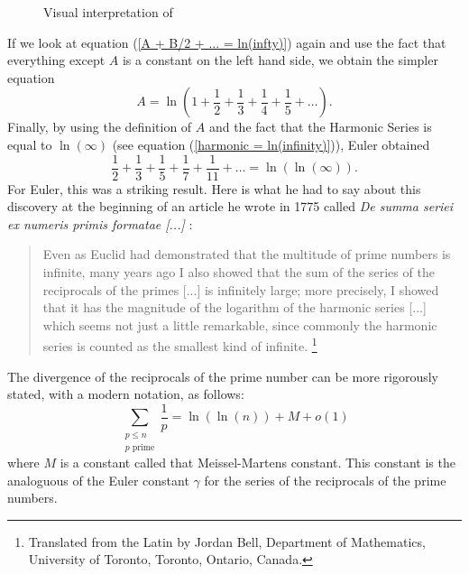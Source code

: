 \begin{figure}[h]
\begin{minipage}{.5\textwidth}
    \caption{Visual interpretation of}
    \label{fig:visual integral}
\end{minipage}
\end{figure}
If we look at equation (\ref{A + B/2 + ...  = ln(infty)}) again and use the fact that everything except $A$ is a constant on the left hand side, we obtain the simpler equation
\begin{equation}
    A = \ln\left(1 + \frac{1}{2} + \frac{1}{3} + \frac{1}{4} + \frac{1}{5} + \dots \right).
\end{equation}
Finally, by using the definition of $A$ and the fact that the Harmonic Series is equal to $\ln(\infty)$ (see equation (\ref{harmonic = ln(infinity)})), Euler obtained
\begin{equation} \label{prime harmonic = ln(ln(infty))}
    \frac{1}{2} + \frac{1}{3} + \frac{1}{5} + \frac{1}{7} + \frac{1}{11} + \dots = \ln(\ln(\infty)).
\end{equation}
For Euler, this was a striking result. Here is what he had to say about this discovery at the beginning of an article he wrote in 1775 called \textit{De summa seriei ex numeris primis formatae [...]} \cite{euler1785summa}:

\begin{quotation}
    Even as Euclid had demonstrated that the multitude of prime numbers is infinite, many years ago I also showed that the sum of the series of the reciprocals of the primes [...] is infinitely large; more precisely, I showed that it has the magnitude of the logarithm of the harmonic series [...] which seems not just a little remarkable, since commonly the harmonic series is counted as the smallest kind of infinite. \footnote{Translated from the Latin by Jordan Bell, Department of Mathematics, University of Toronto, Toronto, Ontario, Canada.}
\end{quotation}

The divergence of the reciprocals of the prime number can be more rigorously stated, with a modern notation, as follows:
\begin{equation}
    \sum_{\substack{p \leq n \\ p \text{ prime}}}\frac{1}{p} = \ln(\ln(n)) + M + o(1)
\end{equation}
where $M$ is a constant called that Meissel-Martens constant. This constant is the analoguous of the Euler constant $\gamma$ for the series of the reciprocals of the prime numbers.

